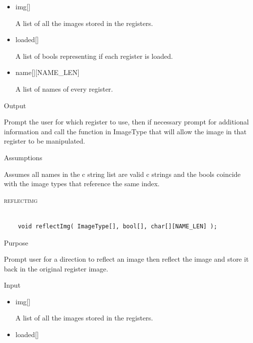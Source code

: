 \documentclass[pdftex, 11pt]{article}
\begin{document}
\begin{description}
\begin{description}
\begin{itemize}
					\item{img[]}

						A list of all the images stored in the registers.

					\item{loaded[]}

						A list of bools representing if each register is loaded.

					\item{name[][NAME\_LEN]}

						A list of names of every register.

				\end{itemize}

			\item{Output}

				Prompt the user for which register to use, then if necessary
				prompt for additional information and call the function
				in ImageType that will allow the image in that register to
				be manipulated.

			\item{Assumptions}

				Assumes all names in the c string list are valid c
				strings and the bools coincide with the image types that
				reference the same index.

		\end{description}



	\item{\textsc{reflectimg}}

		\begin{lstlisting}

	void reflectImg( ImageType[], bool[], char[][NAME_LEN] );
		\end{lstlisting}

		\begin{description}
			\item{Purpose}

				Prompt user for a direction to reflect an image then reflect the image and
				store it back in the original register image.

			\item{Input}

				\begin{itemize}

					\item{img[]}

						A list of all the images stored in the registers.

					\item{loaded[]}


\end{itemize}
\end{description}
\end{description}
\end{document}
